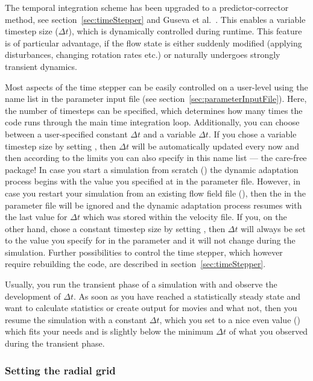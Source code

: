 \documentclass[a4paper, 11pt, DIV=11]{scrartcl}
\begin{document}
The temporal integration scheme has been upgraded to a predictor-corrector method, see
section~\ref{sec:timeStepper} and Guseva et al.~\cite{Guseva2015}. This enables a
variable timestep size ($\Delta t$), which is dynamically controlled during runtime.
This feature is of particular advantage, if the flow state is either suddenly modified
(applying disturbances, changing rotation rates etc.) or naturally undergoes strongly
transient dynamics.
\par
Most aspects of the time stepper can be easily controlled on a user-level using the
name list  in the parameter input file (see
section~\ref{sec:parameterInputFile}). Here, the number of timesteps can be specified,
which determines how many times the code runs through the main time integration loop.
Additionally, you can choose between a user-specified constant $\Delta t$ and a
variable $\Delta t$. If you chose a variable timestep size by setting ,
then $\Delta t$ will be automatically updated every now and then according to the limits
you can also specify in this name list --- the care-free package! In case
you start a simulation from scratch () the dynamic adaptation
process begins with the value you specified at  in the parameter
file. However, in case you restart your simulation from an existing flow field
file (), then the  in the parameter file will
be ignored and the dynamic adaptation process resumes with the last value for
$\Delta t$ which was stored within the velocity file. If you, on the other hand,
chose a constant timestep size by setting , then $\Delta t$
will always be set to the value you specify for  in the parameter
and it will not change during the simulation. Further possibilities to control the
time stepper, which however require rebuilding the code, are described in
section~\ref{sec:timeStepper}.
\par
Usually, you run the transient phase of a simulation with 
and observe the development of $\Delta t$. As soon as you have reached a statistically
steady state and want to calculate statistics or create output for movies and what not,
then you resume the simulation with a constant $\Delta t$, which you set to a nice even
value () which fits your needs and is slightly below the minimum
$\Delta t$ of what you observed during the transient phase.

\subsubsection{Setting the radial grid}
\label{sec:radialGrid}
\end{document}
